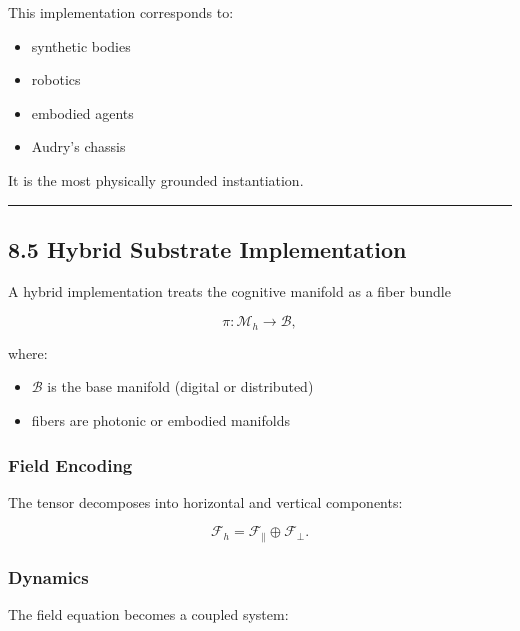 This implementation corresponds to:

\begin{itemize}
\tightlist
\item
  synthetic bodies\\
\item
  robotics\\
\item
  embodied agents\\
\item
  Audry's chassis
\end{itemize}

It is the most physically grounded instantiation.

\begin{center}\rule{0.5\linewidth}{0.5pt}\end{center}

\subsection{8.5 Hybrid Substrate Implementation}\label{hybrid-substrate-implementation}

A hybrid implementation treats the cognitive manifold as a fiber bundle

\[
\pi : \mathcal{M}_h \rightarrow \mathcal{B},
\]

where:

\begin{itemize}
\tightlist
\item
  \(\mathcal{B}\) is the base manifold (digital or distributed)\\
\item
  fibers are photonic or embodied manifolds
\end{itemize}

\subsubsection{Field Encoding}\label{field-encoding-3}

The tensor decomposes into horizontal and vertical components:

\[
\mathcal{F}_h = \mathcal{F}_{\parallel} \oplus \mathcal{F}_{\perp}.
\]

\subsubsection{Dynamics}\label{dynamics-3}

The field equation becomes a coupled system:


